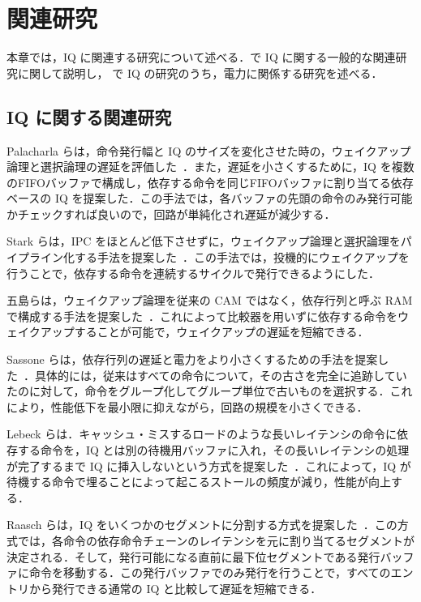 
\chapter{関連研究}
\label{sec:related_work}
本章では，IQ に関連する研究について述べる．で IQ に関する一般的な関連研究に関して説明し， で IQ の研究のうち，電力に関係する研究を述べる．

\section{IQ に関する関連研究}
\label{sec:relate_IQ}
Palacharla らは，命令発行幅と IQ のサイズを変化させた時の，ウェイクアップ論理と選択論理の遅延を評価した~\cite{Palacharla1997}．また，遅延を小さくするために，IQ を複数のFIFOバッファで構成し，依存する命令を同じFIFOバッファに割り当てる依存ベースの IQ を提案した．この手法では，各バッファの先頭の命令のみ発行可能かチェックすれば良いので，回路が単純化され遅延が減少する．

Stark らは，IPC をほとんど低下させずに，ウェイクアップ論理と選択論理をパイプライン化する手法を提案した~\cite{Stark2000}．この手法では，投機的にウェイクアップを行うことで，依存する命令を連続するサイクルで発行できるようにした．

五島らは，ウェイクアップ論理を従来の CAM ではなく，依存行列と呼ぶ RAM で構成する手法を提案した~\cite{goshima2001}．これによって比較器を用いずに依存する命令をウェイクアップすることが可能で，ウェイクアップの遅延を短縮できる．

Sassone らは，依存行列の遅延と電力をより小さくするための手法を提案した~\cite{sassone2007}．具体的には，従来はすべての命令について，その古さを完全に追跡していたのに対して，命令をグループ化してグループ単位で古いものを選択する．これにより，性能低下を最小限に抑えながら，回路の規模を小さくできる．

Lebeck らは．キャッシュ・ミスするロードのような長いレイテンシの命令に依存する命令を，IQ とは別の待機用バッファに入れ，その長いレイテンシの処理が完了するまで IQ に挿入しないという方式を提案した~\cite{Lebeck2002}．これによって，IQ が待機する命令で埋ることによって起こるストールの頻度が減り，性能が向上する．

Raasch らは，IQ をいくつかのセグメントに分割する方式を提案した~\cite{Raasch2002}．この方式では，各命令の依存命令チェーンのレイテンシを元に割り当てるセグメントが決定される．そして，発行可能になる直前に最下位セグメントである発行バッファに命令を移動する．この発行バッファでのみ発行を行うことで，すべてのエントリから発行できる通常の IQ と比較して遅延を短縮できる．

